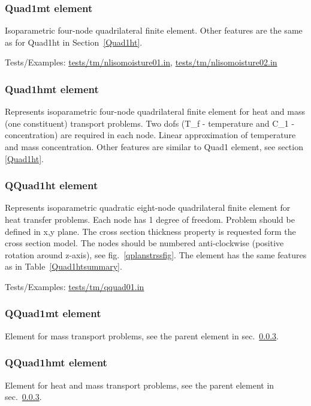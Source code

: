\documentclass[a4paper]{article}
\begin{document}
\subsubsection{Quad1mt element}
Isoparametric four-node quadrilateral finite element.
Other features are the same as for Quad1ht in Section~\ref{Quad1ht}.

Tests/Examples: \href{https://github.com/oofem/oofem/blob/devel/tests/tm/nlisomoisture01.in}{tests/tm/nlisomoisture01.in}, \href{https://github.com/oofem/oofem/blob/devel/tests/tm/nlisomoisture02.in}{tests/tm/nlisomoisture02.in}

\subsubsection{Quad1hmt element}
Represents isoparametric four-node quadrilateral finite element for
heat and mass (one constituent) transport problems. 
Two dofs (T\_f - temperature and C\_1 - concentration) are required in
each node. Linear approximation of temperature and mass concentration.
Other features are similar to Quad1 element, see section \ref{Quad1ht}.

\subsubsection{QQuad1ht element}
\label{QQuad1ht}
Represents isoparametric quadratic eight-node quadrilateral finite element for
heat transfer problems. Each node has 1 degree of freedom.
Problem should be defined in x,y plane. The cross section thickness
property is requested form the cross section model.
The nodes should be numbered anti-clockwise (positive rotation around
z-axis), see fig.~\ref{qplanstrssfig}. The element has the same features as in Table~\ref{Quad1htsummary}.

Tests/Examples: \href{https://github.com/oofem/oofem/blob/devel/tests/tm/qquad01.in}{tests/tm/qquad01.in}

\subsubsection{QQuad1mt element}
Element for mass transport problems, see the parent element in sec.~\ref{QQuad1ht}. 

\subsubsection{QQuad1hmt element}
Element for heat and mass transport problems, see the parent element in sec.~\ref{QQuad1ht}.
\end{document}
